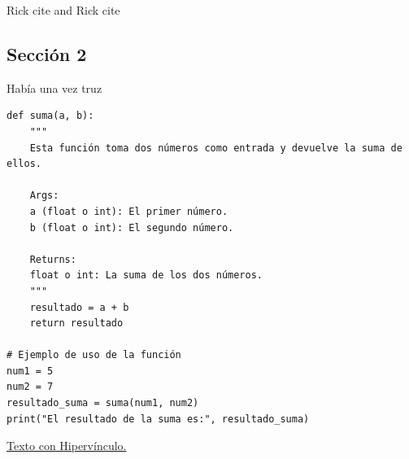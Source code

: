 Rick cite \cite{book} and Rick cite \cite{online}
\clearpage
\subsection{Sección 2}
\begin{tcolorbox}
[colback=white!5!white,colframe=green!75!black,fonttitle=\bfseries,title=Cuadro]
Había una vez truz
\end{tcolorbox}

\begin{tcolorbox}
[colback=white!5!white,colframe=blue!75!black,fonttitle=\bfseries,title=Cuadro con código]
\begin{verbatim}
def suma(a, b):
    """
    Esta función toma dos números como entrada y devuelve la suma de ellos.
    
    Args:
    a (float o int): El primer número.
    b (float o int): El segundo número.
    
    Returns:
    float o int: La suma de los dos números.
    """
    resultado = a + b
    return resultado

# Ejemplo de uso de la función
num1 = 5
num2 = 7
resultado_suma = suma(num1, num2)
print("El resultado de la suma es:", resultado_suma)

\end{verbatim}
\end{tcolorbox}





\href{https://youtu.be/mCdA4bJAGGk}{Texto con Hipervínculo.}


\clearpage